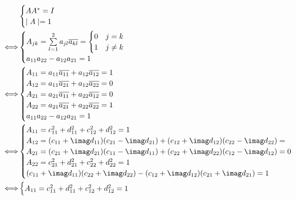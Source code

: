 \documentclass[dvipdfmx,titlepage, 11pt, a4paper]{jsarticle}%
\begin{document}
\begin{itemize}
\begin{align*}
        & \begin{cases}
            AA^{\ast} = I\\
            \mid A\mid = 1
        \end{cases}\\
        \Longleftrightarrow & 
        \begin{cases}
            A_{jk} = \sum\limits_{l = 1}^{2} a_{jl}\overline{a_{kl}}
            = 
            \begin{cases}
                0 & j = k\\
                1 & j \neq k  
            \end{cases}\\
            a_{11}a_{22} - a_{12}a_{21} = 1
        \end{cases}\\
        \Longleftrightarrow & 
        \begin{cases}
            A_{11} = a_{11}\overline{a_{11}} + a_{12}\overline{a_{12}} = 1\\
            A_{12} = a_{11}\overline{a_{21}} + a_{12}\overline{a_{22}} = 0\\
            A_{21} = a_{21}\overline{a_{11}} + a_{22}\overline{a_{12}} = 0\\
            A_{22} = a_{21}\overline{a_{21}} + a_{22}\overline{a_{22}} = 1\\
            a_{11}a_{22} - a_{12}a_{21} = 1
        \end{cases}\\
        \Longleftrightarrow & 
        \begin{cases}
            A_{11} = c_{11}^{2} + d_{11}^{2} + c_{12}^{2} + d_{12}^{2} = 1\\
            A_{12} = (c_{11} + \imag d_{11})(c_{21} - \imag d_{21}) + (c_{12} + \imag d_{12})(c_{22} - \imag d_{22}) = \\
            A_{21} = (c_{21} + \imag d_{21})(c_{11} - \imag d_{11}) + (c_{22} 
+ \imag d_{22})(c_{12} - \imag d_{12}) = 0\\
            A_{22} = c_{21}^{2} + d_{21}^{2} + c_{22}^{2} + d_{22}^{2} = 1\\
            (c_{11} + \imag d_{11})(c_{22} + \imag d_{22}) - (c_{12} + \imag d_{12})(c_{21} + \imag d_{21}) = 1
        \end{cases}\\
        \Longleftrightarrow & 
        \begin{cases}
            A_{11} = c_{11}^{2} + d_{11}^{2} + c_{12}^{2} + d_{12}^{2} = 1\\

\end{cases}
\end{align*}
\end{itemize}
\end{document}
